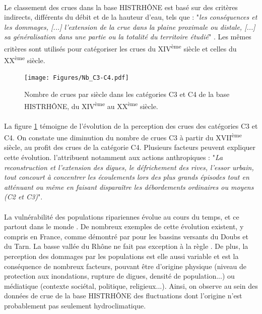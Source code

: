 \documentclass[11pt]{article}
\begin{document}
	\paragraph{} Le classement des crues dans la base HISTRHÔNE est basé sur des critères indirects, différents du débit et de la hauteur d'eau, tels que : "\textit{les conséquences et les dommages, [...] l'extension de la crue dans la plaine proximale ou distale, [...] sa généralisation dans une partie ou la totalité du territoire étudié}" \citep{pichard_sept_2014}. Les mêmes critères sont utilisés pour catégoriser les crues du XIV\textsuperscript{ème} siècle et celles du XX\textsuperscript{ème} siècle. 
	
	\begin{figure}[h]
	\centering
		\texttt{[image: Figures/Nb\_C3-C4.pdf]}
        \caption{Nombre de crues par siècle dans les catégories C3 et C4 de la base HISTRHÔNE, du XIV\textsuperscript{ème} au XX\textsuperscript{ème} siècle.}
		\label{fig:Nb_C3C4}
	\end{figure}	
	
	\paragraph{} La figure \ref{fig:Nb_C3C4} témoigne de l'évolution de la perception des crues des catégories C3 et C4. On constate une diminution du nombre de crues C3 à partir du XVII\textsuperscript{ème} siècle, au profit des crues de la catégorie C4. Plusieurs facteurs peuvent expliquer cette évolution. \citet{pichard_sept_2014} l'attribuent notamment aux actions anthropiques : "\textit{La reconstruction et l'extension des digues, le défrichement des rives, l'essor urbain, tout concourt à concentrer les écoulements lors des plus grands épisodes tout en atténuant ou même en faisant disparaître les débordements ordinaires ou moyens (C2 et C3)}". 
	
	\paragraph{} La vulnérabilité des populations ripariennes évolue au cours du temps, et ce partout dans le monde \citep{kron_flood_2002}. De nombreux exemples de cette évolution existent, y compris en France, comme démontré par \citet{boudou_assessing_2016} pour les bassins versants du Doubs et du Tarn. La basse vallée du Rhône ne fait pas exception à la règle \citep{piegay_observatoire_2022}. De plus, la perception des dommages par les populations est elle aussi variable et est la conséquence de nombreux facteurs, pouvant être d'origine physique (niveau de protection aux inondations, rupture de digues, densité de population...) ou médiatique (contexte sociétal, politique, religieux...). Ainsi, on observe au sein des données de crue de la base HISTRHÔNE des fluctuations dont l'origine n'est probablement pas seulement hydroclimatique. 
	
\end{document}
